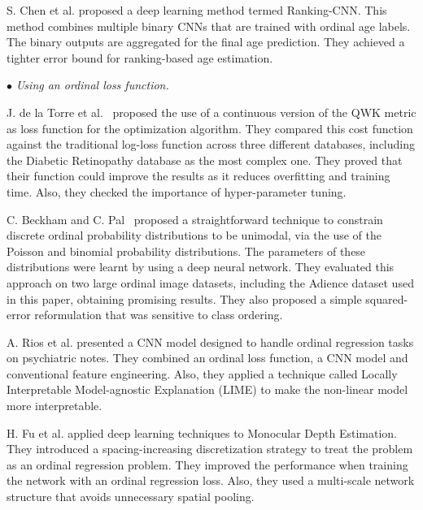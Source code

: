 \documentclass[journal]{IEEEtran}
\begin{document}
	S. Chen et al. \cite{chen2017using} proposed a deep learning method termed Ranking-CNN. This method combines multiple binary CNNs that are trained with ordinal age labels. The binary outputs are aggregated for the final age prediction. They achieved a tighter error bound for ranking-based age estimation.
	
	
	\vspace{0.2cm}
	$\bullet$ \textit{Using an ordinal loss function.}
	
	J. de la Torre et al.~\cite{de2018weighted} proposed the use of a continuous version of the QWK metric as loss function for the optimization algorithm. They compared this cost function against the traditional log-loss function across three different databases, including the Diabetic Retinopathy database as the most complex one. They proved that their function could improve the results as it reduces overfitting and training time. Also, they checked the importance of hyper-parameter tuning.
	
	C. Beckham and C. Pal~\cite{beckham2017unimodal} proposed a straightforward technique to constrain discrete ordinal probability distributions to be unimodal, via the use of the Poisson and binomial probability distributions. The parameters of these distributions were learnt by using a deep neural network. They evaluated this approach on two large ordinal image datasets, including the Adience dataset used in this paper, obtaining promising results. They also proposed a simple squared-error reformulation \cite{beckham2016simple} that was sensitive to class ordering.
	
	A. Rios et al. \cite{rios2017ordinal} presented a CNN model designed to handle ordinal regression tasks on psychiatric notes. They combined an ordinal loss function, a CNN model and conventional feature engineering. Also, they applied a technique called Locally Interpretable Model-agnostic Explanation (LIME) to make the non-linear model more interpretable.
	
	H. Fu et al. \cite{fu2018deep} applied deep learning techniques to Monocular Depth Estimation. They introduced a spacing-increasing discretization strategy to treat the problem as an ordinal regression problem. They improved the performance when training the network with an ordinal regression loss. Also, they used a multi-scale network structure that avoids unnecessary spatial pooling.
	
\end{document}
